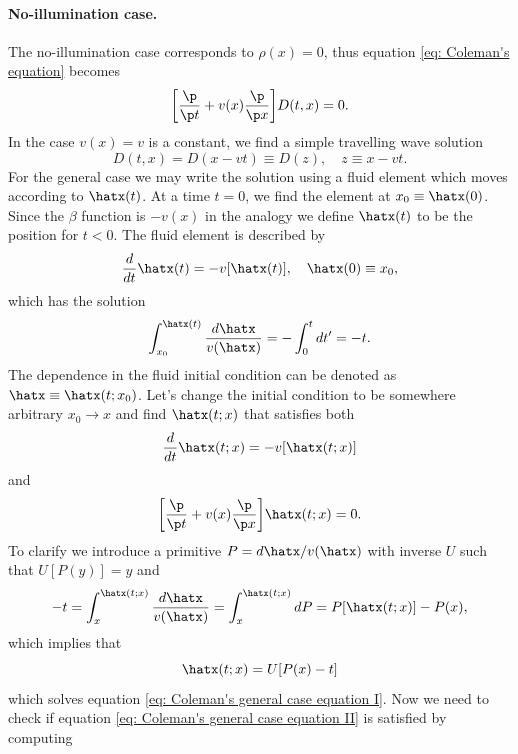 \paragraph{No-illumination case.} The no-illumination case corresponds to $\rho(x) = 0$, thus equation \eqref{eq: Coleman's equation} becomes
\begin{equation}
    \bigg[\frac{\p}{\p t} + v(x)\frac{\p}{\p x}\bigg]D(t,x) = 0.
\end{equation}
In the case $v(x) = v$ is a constant, we find a simple travelling wave solution 
\begin{equation}
    D(t,x) = D(x - vt) \equiv D(z),\quad z \equiv x - vt.
\end{equation}
For the general case we may write the solution using a fluid element which moves according to $\hatx(t)$. At a time $t = 0$, we find the element at $x_0 \equiv \hatx(0)$. Since the $\beta$ function is $-v(x)$ in the analogy we define $\hatx(t)$ to be the position for $t < 0$. The fluid element is described by
\begin{equation}
    \frac{d}{dt}\hatx(t) = -v[\hatx(t)],\quad \hatx(0) \equiv x_0,
\end{equation}
which has the solution 
\begin{equation}
    \int_{x_0}^{\hatx(t)}\frac{d\hatx}{v(\hatx)} = -\int_0^tdt' = -t.
\end{equation}
The dependence in the fluid initial condition can be denoted as $\hatx \equiv \hatx(t;x_0)$. Let's change the initial condition to be somewhere arbitrary $x_0 \to x$ and find $\hatx(t;x)$ that satisfies both
\begin{equation}
\label{eq: Coleman's general case equation I}
    \dfrac{d}{dt}\hatx(t;x) = -v[\hatx(t;x)]
\end{equation}
and
\begin{equation}
\label{eq: Coleman's general case equation II}
    \bigg[\dfrac{\p}{\p t} + v(x)\dfrac{\p}{\p x}\bigg]\hatx(t;x) = 0.
\end{equation}
To clarify we introduce a primitive $P = d\hatx/v(\hatx)$ with inverse $U$ such that $U[P(y)] = y$ and 
\begin{equation}
    -t = \int_x^{\hatx(t;x)}\frac{d\hatx}{v(\hatx)} = \int_x^{\hatx(t;x)}dP = P[\hatx(t;x)] - P(x),
\end{equation}
which implies that 
\begin{equation}
    \hatx(t;x) = U[P(x) - t]
\end{equation}
which solves equation \eqref{eq: Coleman's general case equation I}. Now we need to check if equation \eqref{eq: Coleman's general case equation II} is satisfied by computing
